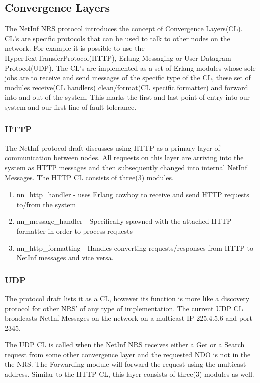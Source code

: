 \subsection {Convergence Layers}
\label{CL}
The NetInf NRS protocol introduces the concept of Convergence Layers(CL). CL's are specific protocols that can be used to talk to other nodes on the network. For example it is possible to use the HyperTextTransferProtocol(HTTP), Erlang Messaging or User Datagram Protocol(UDP). The CL's are implemented as a set of Erlang modules whose sole jobs are to receive and send messages of the specific type of the CL, these set of modules  receive(CL handlers) clean/format(CL specific formatter) and forward into and out of the system. This marks the first and last point of entry into our system and our first line of fault-tolerance. 

\subsubsection{HTTP}

The NetInf protocol draft discusses using HTTP as a primary layer of communication between nodes. All requests on this layer are arriving into the system as HTTP messages and then subsequently changed into internal NetInf Messages. The HTTP CL consists of three(3) modules. 

\begin{enumerate}
\item nn\_http\_handler - uses Erlang cowboy to receive and send HTTP requests to/from the system
\item nn\_message\_handler - Specifically spawned with the attached HTTP formatter in order to process requests
\item nn\_http\_formatting - Handles converting requests/responses from HTTP to NetInf messages and vice versa.
\end{enumerate}

\subsubsection{UDP}

The protocol draft lists it as a CL, however its function is more like a discovery protocol for other NRS' of any type of implementation. The current UDP CL broadcasts NetInf Messages on the network on a multicast IP 225.4.5.6 and port 2345. 

The UDP CL is called when the NetInf NRS receives either a Get or a Search request from some other convergence layer and the requested NDO is not in the the NRS. The Forwarding module will forward the request using the multicast address. Similar to the HTTP CL, this layer consists of three(3) modules as well. 

